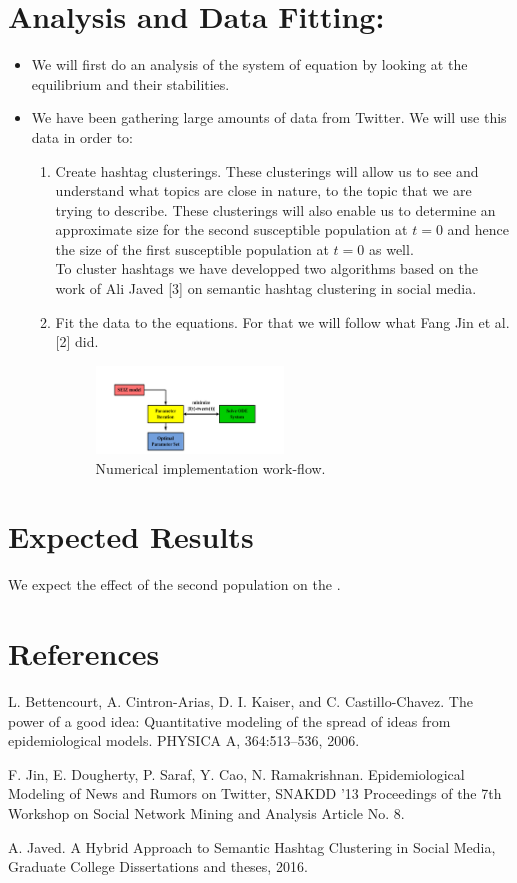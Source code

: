 \documentclass{article}
\begin{document}
\section{Analysis and Data Fitting:}
\begin{itemize}
\item We will first do an analysis of the system of equation by looking at the equilibrium and their stabilities. 
\item We have been gathering large amounts of data from Twitter. We will use this data in order to:
\begin{enumerate}
\item Create hashtag clusterings. These clusterings will allow us to see and understand what topics are close in nature, to the topic that we are trying to describe. These clusterings will also enable us to determine an approximate size for the second susceptible population at $t=0$ and hence the size of the first susceptible population at $t=0$ as well.
\\To cluster hashtags we have developped two algorithms based on the work of Ali Javed [3] on semantic hashtag clustering in social media. 
\item Fit the data to the equations. For that we will follow what Fang Jin et al. [2] did. \\
\begin{figure}[h]
\centering
\includegraphics[width=0.5\textwidth]{workflow.png}
\caption{Numerical implementation work-flow.}
\end{figure}

\end{enumerate}

\end{itemize}
\section{Expected Results}
We expect the effect of the second population on the . 
\section{References}
\begin{enumerate}[label={[\arabic*]}]
\item  L. Bettencourt, A. Cintron-Arias, D. I. Kaiser, and C. Castillo-Chavez. The power of a good idea: Quantitative modeling of the spread of ideas from epidemiological models. PHYSICA A, 364:513–536, 2006.
\item F. Jin, E. Dougherty, P. Saraf, Y. Cao, N. Ramakrishnan. Epidemiological Modeling of News and Rumors on Twitter, SNAKDD '13 Proceedings of the 7th Workshop on Social Network Mining and Analysis
Article No. 8.
\item A. Javed. A Hybrid Approach to Semantic Hashtag Clustering in Social Media, Graduate College Dissertations and  theses, 2016.
\end{enumerate}
\end{document}
